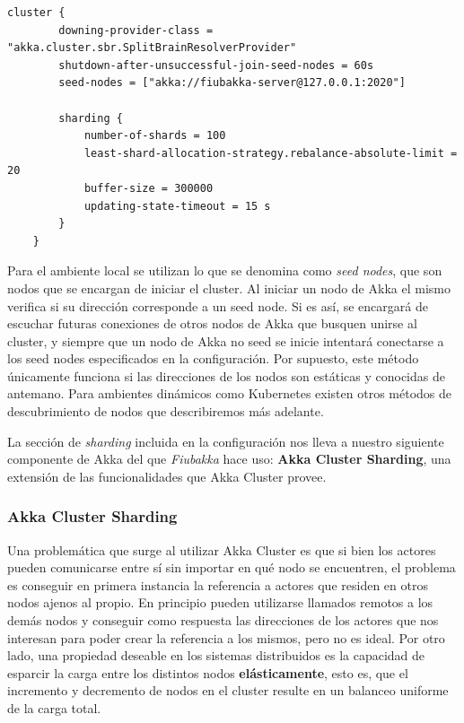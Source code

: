 \begin{lstlisting}[language=applicationconf, caption={\textbf{Configuración de Akka Cluster Fiubakka}}]
    cluster {
        downing-provider-class = "akka.cluster.sbr.SplitBrainResolverProvider"
        shutdown-after-unsuccessful-join-seed-nodes = 60s
        seed-nodes = ["akka://fiubakka-server@127.0.0.1:2020"]

        sharding {
            number-of-shards = 100
            least-shard-allocation-strategy.rebalance-absolute-limit = 20
            buffer-size = 300000
            updating-state-timeout = 15 s
        }
    }
\end{lstlisting}

Para el ambiente local se utilizan lo que se denomina como \textit{seed nodes}, que son nodos que se encargan de iniciar el cluster.
Al iniciar un nodo de Akka el mismo verifica si su dirección corresponde a un seed node. Si es así, se encargará de escuchar futuras
conexiones de otros nodos de Akka que busquen unirse al cluster, y siempre que un nodo de Akka no seed se inicie intentará conectarse a los seed nodes especificados
en la configuración. Por supuesto, este método únicamente funciona si las direcciones de los nodos son estáticas y conocidas de antemano.
Para ambientes dinámicos como Kubernetes existen otros métodos de descubrimiento de nodos que describiremos más adelante.

La sección de \textit{sharding} incluida en la configuración nos lleva a nuestro siguiente componente de Akka del que \textit{Fiubakka}
hace uso: \textbf{Akka Cluster Sharding}, una extensión de las funcionalidades que Akka Cluster provee.

\subsubsection{Akka Cluster Sharding}

\noindent Una problemática que surge al utilizar Akka Cluster es que si bien los actores pueden comunicarse entre sí sin importar en qué nodo
se encuentren, el problema es conseguir en primera instancia la referencia a actores que residen en otros nodos ajenos al propio. En principio
pueden utilizarse llamados remotos a los demás nodos y conseguir como respuesta las direcciones de los actores que nos interesan para poder
crear la referencia a los mismos, pero no es ideal. Por otro lado, una propiedad deseable en los sistemas distribuidos es la capacidad
de esparcir la carga entre los distintos nodos \textbf{elásticamente}, esto es, que el incremento y decremento de nodos en el cluster
resulte en un balanceo uniforme de la carga total.


